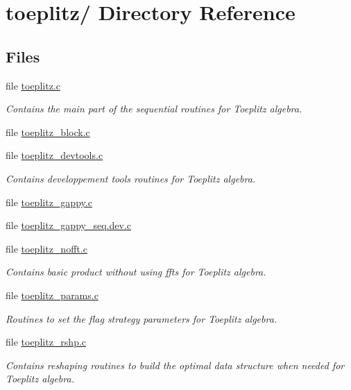 \section{toeplitz/ Directory Reference}
\label{dir_047e6a79ec3005ff33af710a2117944f}
\subsection*{Files}
\begin{DoxyCompactItemize}
\item 
file \hyperlink{toeplitz_8c}{toeplitz.\-c}
\begin{DoxyCompactList}\small\item\em Contains the main part of the sequential routines for Toeplitz algebra. \end{DoxyCompactList}\item 
file \hyperlink{toeplitz__block_8c}{toeplitz\-\_\-block.\-c}
\item 
file \hyperlink{toeplitz__devtools_8c}{toeplitz\-\_\-devtools.\-c}
\begin{DoxyCompactList}\small\item\em Contains developpement tools routines for Toeplitz algebra. \end{DoxyCompactList}\item 
file \hyperlink{toeplitz__gappy_8c}{toeplitz\-\_\-gappy.\-c}
\item 
file \hyperlink{toeplitz__gappy__seq_8dev_8c}{toeplitz\-\_\-gappy\-\_\-seq.\-dev.\-c}
\item 
file \hyperlink{toeplitz__nofft_8c}{toeplitz\-\_\-nofft.\-c}
\begin{DoxyCompactList}\small\item\em Contains basic product without using ffts for Toeplitz algebra. \end{DoxyCompactList}\item 
file \hyperlink{toeplitz__params_8c}{toeplitz\-\_\-params.\-c}
\begin{DoxyCompactList}\small\item\em Routines to set the flag strategy parameters for Toeplitz algebra. \end{DoxyCompactList}\item 
file \hyperlink{toeplitz__rshp_8c}{toeplitz\-\_\-rshp.\-c}
\begin{DoxyCompactList}\small\item\em Contains reshaping routines to build the optimal data structure when needed for Toeplitz algebra. \end{DoxyCompactList}\item 

\end{DoxyCompactItemize}
